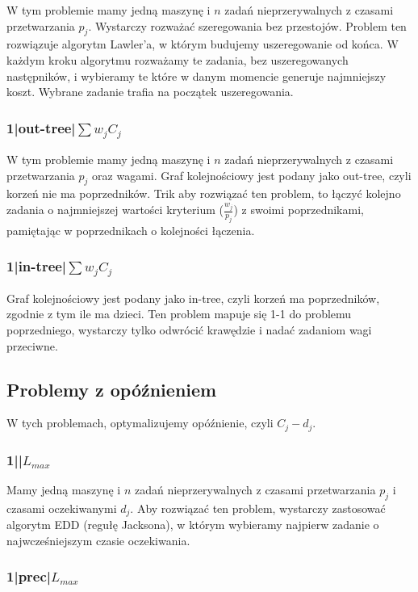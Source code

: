 \documentclass{../notatki}
\begin{document}
W tym problemie mamy jedną maszynę i $n$ zadań nieprzerywalnych z
czasami przetwarzania $p_j$.
Wystarczy rozważać szeregowania bez przestojów. Problem ten rozwiązuje
algorytm Lawler'a, w którym budujemy uszeregowanie od końca. W każdym kroku
algorytmu rozważamy te zadania, bez uszeregowanych następników, i wybieramy
te które w danym momencie generuje najmniejszy koszt. Wybrane zadanie
trafia na początek uszeregowania.

\subsubsection{1|out-tree|\texorpdfstring{$\sum w_jC_j$}{sum wjCj}}

W tym problemie mamy jedną maszynę i $n$ zadań nieprzerywalnych z
czasami przetwarzania $p_j$ oraz wagami. Graf kolejnościowy jest podany
jako out-tree, czyli korzeń nie ma poprzedników.
Trik aby rozwiązać ten problem, to łączyć kolejno zadania o
najmniejszej wartości
kryterium ($\frac{w_j}{p_j}$) z swoimi poprzednikami, pamiętając w poprzednikach
o kolejności łączenia.

\subsubsection{1|in-tree|\texorpdfstring{$\sum w_jC_j$}{sum wjCj}}

Graf kolejnościowy jest podany jako in-tree, czyli korzeń ma
poprzedników, zgodnie z tym ile ma dzieci.
Ten problem mapuje się 1-1 do problemu poprzedniego, wystarczy tylko
odwrócić krawędzie i nadać zadaniom wagi przeciwne.

\subsection{Problemy z opóźnieniem}

W tych problemach, optymalizujemy opóźnienie, czyli $C_j - d_j$.

\subsubsection{1||\texorpdfstring{$L_{max}$}{Lmax}}

Mamy jedną maszynę i $n$ zadań nieprzerywalnych z czasami przetwarzania $p_j$
i czasami oczekiwanymi $d_j$. Aby rozwiązać ten problem, wystarczy zastosować
algorytm EDD (regułę Jacksona), w którym wybieramy najpierw zadanie o
najwcześniejszym czasie oczekiwania.

\subsubsection{1|prec|\texorpdfstring{$L_{max}$}{Lmax}}
\end{document}
